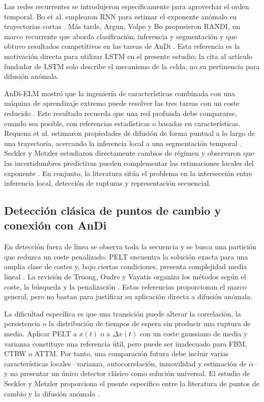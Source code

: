 \documentclass[a4paper,12pt]{article}
\begin{document}
Las redes recurrentes se introdujeron específicamente para aprovechar el orden temporal. Bo et al. emplearon RNN para estimar el exponente anómalo en trayectorias cortas \cite{bo2019measurement}. Más tarde, Argun, Volpe y Bo propusieron RANDI, un marco recurrente que aborda clasificación, inferencia y segmentación y que obtuvo resultados competitivos en las tareas de AnDi \cite{argun2021classification}. Esta referencia es la motivación directa para utilizar LSTM en el presente estudio; la cita al artículo fundador de LSTM solo describe el mecanismo de la celda, no su pertinencia para difusión anómala.

AnDi-ELM mostró que la ingeniería de características combinada con una máquina de aprendizaje extremo puede resolver las tres tareas con un coste reducido \cite{manzo2021elm}. Este resultado recuerda que una red profunda debe compararse, cuando sea posible, con referencias estadísticas o basadas en características. Requena et al. estimaron propiedades de difusión de forma puntual a lo largo de una trayectoria, acercando la inferencia local a una segmentación temporal \cite{requena2023pointwise}. Seckler y Metzler estudiaron directamente cambios de régimen y observaron que las incertidumbres predictivas pueden complementar las estimaciones locales del exponente \cite{seckler2024changepoint}. En conjunto, la literatura sitúa el problema en la intersección entre inferencia local, detección de rupturas y representación secuencial.

\subsection{Detección clásica de puntos de cambio y conexión con AnDi}

En detección fuera de línea se observa toda la secuencia y se busca una partición que reduzca un coste penalizado. PELT encuentra la solución exacta para una amplia clase de costes y, bajo ciertas condiciones, presenta complejidad media lineal \cite{killick2012optimal}. La revisión de Truong, Oudre y Vayatis organiza los métodos según el coste, la búsqueda y la penalización \cite{truong2020selective}. Estas referencias proporcionan el marco general, pero no bastan para justificar su aplicación directa a difusión anómala.

La dificultad específica es que una transición puede alterar la correlación, la persistencia o la distribución de tiempos de espera sin producir una ruptura de media. Aplicar PELT a $x(t)$ o a $\Delta x(t)$ con un coste gaussiano de media y varianza constituye una referencia útil, pero puede ser inadecuado para FBM, CTRW o ATTM. Por tanto, una comparación futura debe incluir varias características locales --varianza, autocorrelación, inmovilidad y estimación de $\alpha$-- y no presentar un único detector clásico como solución universal. El estudio de Seckler y Metzler proporciona el puente específico entre la literatura de puntos de cambio y la difusión anómala \cite{seckler2024changepoint}.
\end{document}
